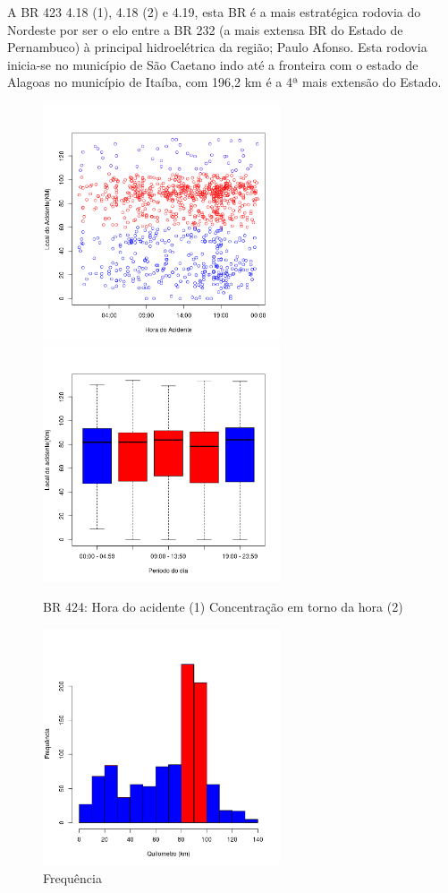 A BR 423 4.18 (1), 4.18 (2)  e 4.19, esta BR é a mais estratégica rodovia do Nordeste por ser o elo entre a BR 232 (a mais extensa BR do Estado de Pernambuco) à principal hidroelétrica da região; Paulo Afonso. Esta rodovia inicia-se no município de São Caetano indo até a fronteira com o estado de Alagoas no município de Itaíba, com 196,2 km é a 4ª mais extensão do Estado.
\pagebreak

\begin{figure}[h]
	\caption{BR 424: Hora do acidente (1) Concentração em torno da hora (2)}
	\includegraphics[width=7cm,height=7cm]{Figuras/Preprocess/br424_1.png}
	\includegraphics[width=7cm,height=7cm]{Figuras/Preprocess/br424_2.png}
	
\end{figure}

\quad \quad
\begin{figure}[h]
	\centering
	\caption{ Frequência}
	\includegraphics[width=7cm,height=7cm]{Figuras/Preprocess/br424_3.png}
\end{figure}

